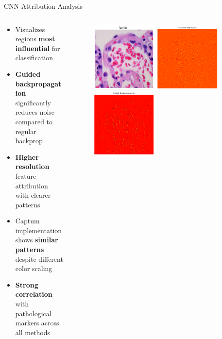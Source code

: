 \documentclass[aspectratio=169,8pt]{beamer}  %
\begin{document}
\begin{frame}{CNN Attribution Analysis}
\begin{columns}[T]
\begin{column}{0.5\textwidth}
\begin{itemize}
\item Visualizes regions \textbf{most influential} for classification
\item \textbf{Guided backpropagation} significantly reduces noise compared to regular backprop
\item \textbf{Higher resolution} feature attribution with clearer patterns
\item Captum implementation shows \textbf{similar patterns} despite different color scaling
\item \textbf{Strong correlation} with pathological markers across all methods
\end{itemize}
\end{column}
\begin{column}{0.5\textwidth}
\begin{figure}
\includegraphics[width=0.45\textwidth]{imgs/normal_image.png}
\vspace{0.2cm}
\includegraphics[width=0.45\textwidth]{imgs/cnn_bp.png}
\vspace{0.2cm}
\includegraphics[width=0.45\textwidth]{imgs/cnn_gbp.png}

\end{figure}
\end{column}
\end{columns}
\end{frame}
\end{document}
